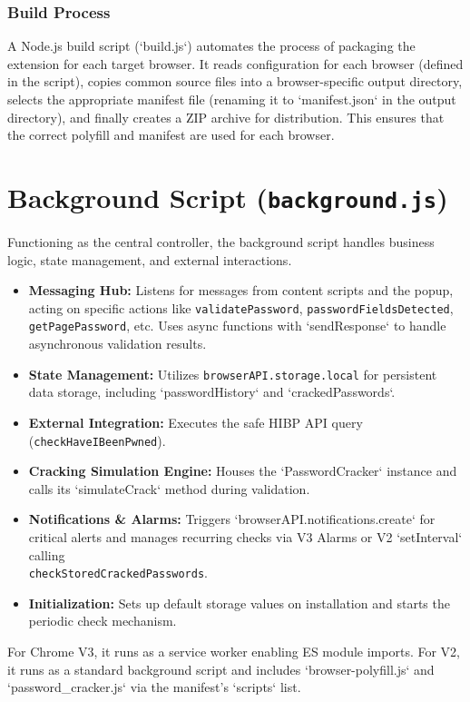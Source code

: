 \documentclass[11pt,oneside,a4paper]{book}
\begin{document}
\subsubsection{Build Process}
A Node.js build script (`build.js`) automates the process of packaging the extension for each target browser. It reads configuration for each browser (defined in the script), copies common source files into a browser-specific output directory, selects the appropriate manifest file (renaming it to `manifest.json` in the output directory), and finally creates a ZIP archive for distribution. This ensures that the correct polyfill and manifest are used for each browser.

\section{Background Script (\texttt{background.js})}
Functioning as the central controller, the background script handles business logic, state management, and external interactions.
\begin{itemize}
    \item \textbf{Messaging Hub:} Listens for messages from content scripts and the popup, acting on specific actions like \texttt{validatePassword}, \texttt{passwordFieldsDetected}, \texttt{getPagePassword}, etc. Uses async functions with `sendResponse` to handle asynchronous validation results.
    \item \textbf{State Management:} Utilizes \texttt{browserAPI.storage.local} for persistent data storage, including `passwordHistory` and `crackedPasswords`.
    \item \textbf{External Integration:} Executes the safe HIBP API query (\texttt{checkHaveIBeenPwned}).
    \item \textbf{Cracking Simulation Engine:} Houses the `PasswordCracker` instance and calls its `simulateCrack` method during validation.
    \item \textbf{Notifications & Alarms:} Triggers `browserAPI.notifications.create` for critical alerts and manages recurring checks via V3 Alarms or V2 `setInterval` calling\\ \texttt{checkStoredCrackedPasswords}.
    \item \textbf{Initialization:} Sets up default storage values on installation and starts the periodic check mechanism.
\end{itemize}
For Chrome V3, it runs as a service worker enabling ES module imports. For V2, it runs as a standard background script and includes `browser-polyfill.js` and `password_cracker.js` via the manifest's `scripts` list.
\end{document}
